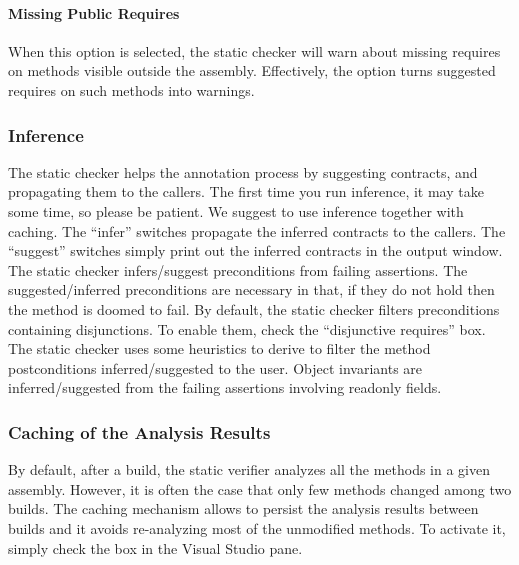\documentclass{article}
\begin{document}
\paragraph{Missing Public Requires}
When this option is selected, the static checker will warn about
missing requires on methods visible outside the assembly. Effectively,
the option turns suggested requires on such methods into warnings.

\subsubsection{Inference}
\label{sec:Inference}
The static checker helps the annotation process by suggesting contracts, and propagating them to the callers.
The first time you run inference, it may take some time, so please be patient.
We suggest to use inference together with caching.
The ``infer'' switches  propagate the inferred contracts to the callers.
The ``suggest'' switches simply print out the inferred contracts in the output window.
The static checker infers/suggest preconditions from failing assertions.
The suggested/inferred preconditions are necessary in that, if they do not hold then the method is doomed to fail.
By default, the static checker filters preconditions containing disjunctions. 
To enable them, check the ``disjunctive requires'' box.
The static checker uses some heuristics to derive to filter the method postconditions inferred/suggested to the user.
Object invariants are inferred/suggested from the failing assertions involving readonly fields.

\subsubsection{Caching of the Analysis Results}
\label{sec:caching}
By default, after a build, the static verifier analyzes all the methods in a given assembly.
However, it is often the case that only few methods changed among two builds.
The caching mechanism allows to persist the analysis results between builds and it avoids re-analyzing most of the unmodified methods. 
To activate it, simply check the box in the Visual Studio pane.
\end{document}
